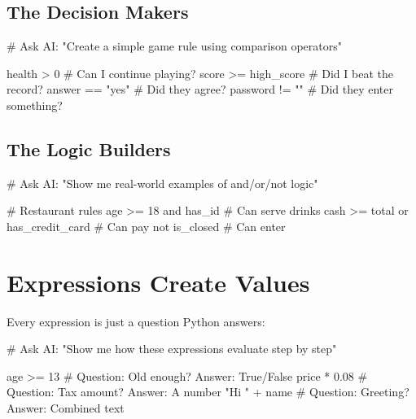 \documentclass[
  letterpaper,
  DIV=11,
  numbers=noendperiod,
  oneside]{scrreprt}
\newenvironment{Shaded}{}{}
\newcommand{\CommentTok}[1]{\textcolor[rgb]{0.42,0.45,0.49}{#1}}
\newcommand{\DecValTok}[1]{\textcolor[rgb]{0.00,0.36,0.77}{#1}}
\newcommand{\FloatTok}[1]{\textcolor[rgb]{0.00,0.36,0.77}{#1}}
\newcommand{\KeywordTok}[1]{\textcolor[rgb]{0.84,0.23,0.29}{#1}}
\newcommand{\NormalTok}[1]{\textcolor[rgb]{0.14,0.16,0.18}{#1}}
\newcommand{\OperatorTok}[1]{\textcolor[rgb]{0.14,0.16,0.18}{#1}}
\newcommand{\StringTok}[1]{\textcolor[rgb]{0.01,0.18,0.38}{#1}}
\begin{document}
\subsection{The Decision Makers}\label{the-decision-makers}

\begin{Shaded}
\begin{Highlighting}[]
\CommentTok{\# Ask AI: "Create a simple game rule using comparison operators"}

\NormalTok{health }\OperatorTok{\textgreater{}} \DecValTok{0}              \CommentTok{\# Can I continue playing?}
\NormalTok{score }\OperatorTok{\textgreater{}=}\NormalTok{ high\_score     }\CommentTok{\# Did I beat the record?}
\NormalTok{answer }\OperatorTok{==} \StringTok{"yes"}         \CommentTok{\# Did they agree?}
\NormalTok{password }\OperatorTok{!=} \StringTok{""}          \CommentTok{\# Did they enter something?}
\end{Highlighting}
\end{Shaded}

\subsection{The Logic Builders}\label{the-logic-builders}

\begin{Shaded}
\begin{Highlighting}[]
\CommentTok{\# Ask AI: "Show me real{-}world examples of and/or/not logic"}

\CommentTok{\# Restaurant rules}
\NormalTok{age }\OperatorTok{\textgreater{}=} \DecValTok{18} \KeywordTok{and}\NormalTok{ has\_id              }\CommentTok{\# Can serve drinks}
\NormalTok{cash }\OperatorTok{\textgreater{}=}\NormalTok{ total }\KeywordTok{or}\NormalTok{ has\_credit\_card   }\CommentTok{\# Can pay}
\KeywordTok{not}\NormalTok{ is\_closed                      }\CommentTok{\# Can enter}
\end{Highlighting}
\end{Shaded}

\section{Expressions Create Values}\label{expressions-create-values}

Every expression is just a question Python answers:

\begin{Shaded}
\begin{Highlighting}[]
\CommentTok{\# Ask AI: "Show me how these expressions evaluate step by step"}

\NormalTok{age }\OperatorTok{\textgreater{}=} \DecValTok{13}                \CommentTok{\# Question: Old enough? Answer: True/False}
\NormalTok{price }\OperatorTok{*} \FloatTok{0.08}             \CommentTok{\# Question: Tax amount? Answer: A number}
\CommentTok{"Hi "} \OperatorTok{+}\NormalTok{ name             }\CommentTok{\# Question: Greeting? Answer: Combined text}
\end{Highlighting}
\end{Shaded}
\end{document}
